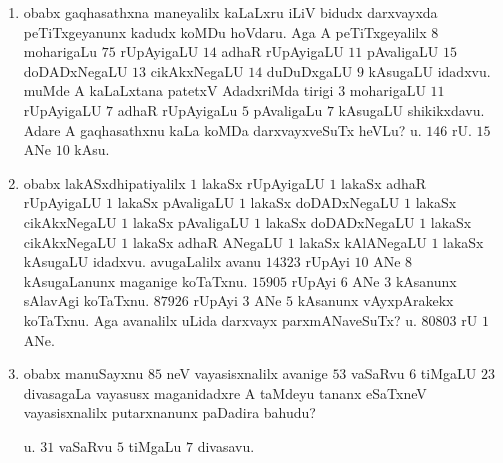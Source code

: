 \begin{enumerate}[\rm(1)]
\item obabx gaqhasathxna maneyalilx kaLaLxru iLiV bidudx darxvayxda peTiTxgeyanunx kadudx koMDu hoVdaru. Aga A peTiTxgeyalilx $8$ moharigaLu $75$ rUpAyigaLU $14$ adhaR rUpAyigaLU $11$ pAvaligaLU $15$ doDADxNegaLU $13$ cikAkxNegaLU $14$ duDuDxgaLU $9$ kAsugaLU idadxvu. muMde A kaLaLxtana patetxV AdadxriMda tirigi $3$ moharigaLU $11$ rUpAyigaLU $7$ adhaR rUpAyigaLu $5$ pAvaligaLu $7$ kAsugaLU shikikxdavu. Adare A gaqhasathxnu kaLa koMDa darxvayxveSuTx heVLu?
\hfill u. $146$ rU. $15$ ANe $10$ kAsu.

\item obabx lakASxdhipatiyalilx $1$ lakaSx rUpAyigaLU $1$ lakaSx adhaR rUpAyigaLU $1$ lakaSx pAvaligaLU $1$ lakaSx doDADxNegaLU $1$ lakaSx cikAkxNegaLU $1$ lakaSx pAvaligaLU $1$ lakaSx doDADxNegaLU $1$ lakaSx cikAkxNegaLU $1$ lakaSx adhaR ANegaLU $1$ lakaSx kAlANegaLU $1$ lakaSx kAsugaLU idadxvu. avugaLalilx avanu $14323$ rUpAyi $10$ ANe $8$ kAsugaLanunx maganige koTaTxnu. $15905$ rUpAyi $6$ ANe $3$ kAsanunx sAlavAgi koTaTxnu. $87926$ rUpAyi $3$ ANe $5$ kAsanunx vAyxpArakekx koTaTxnu. Aga avanalilx uLida darxvayx parxmANaveSuTx?  \hfill u. 
$80803$ rU $1$ ANe.

\item obabx manuSayxnu $85$ neV vayasisxnalilx avanige $53$ vaSaRvu $6$ tiMgaLU $23$ divasagaLa vayasusx maganidadxre A taMdeyu tananx eSaTxneV vayasisxnalilx putarxnanunx paDadira bahudu?

\hfill u. $31$ vaSaRvu $5$ tiMgaLu $7$ divasavu. 
\end{enumerate}
